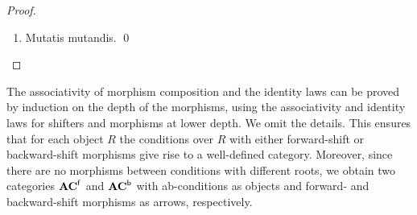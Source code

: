 \begin{fullorname}
\begin{proof}
\begin{enumerate}[resume]
Let $j = o^n(i)$ and let us proceed by cases. If both $n_i:b_i \to \cF^n_i(c_{j})$ and  $m_{j}:c_j \to \cF^m_j(e_{o^m(j)})$ are forward shift morphisms, we have $m_{j}:\cF^n_i(c_j) \to \cF^n_i(\cF^m_j(e_{o^m(j)}))$ by , and hence $\cF^m_j;\cF^n_i$ is a forward shifter for $v_i$ by  and, using the inductive hypothesis, $n_i;m_{o^n(i)}:b_i \to \cF^n_i(\cF^m_j(e_{o(i)}))$  is a forward shift morphism. 

If $e_{o(i)}$ has depth 0, then $m_{j}:c_j \to \zeroCond{P^c_j}$ is the terminal morphims, by Def.~\ref{def:ab-morphism} and clause 3 of . If $n_i:b_i \to \cF^n_i(c_{j})$ is a forward shift morphism then we obtain 
$n_i;m_{o^n(i)}:b_i \to \cF^n_i(\zeroCond{P^c_j})$ as above, and observe that $\cF^n_i(\zeroCond{P^c_j}) = \zeroCond{P^b_i}$, as desired. Otherwise, if $c_j$ has depth 0, then
$n_i: b_i \to \zeroCond{P^b_i}$ is the terminal morphism, and  $m_{j}:c_j \to \zeroCond{P^c_j}$ is the identity defined as $m_{j} = id_{\zeroCond{P^c_j}} = (o = \varnothing, \epsilon)$, that we can see as well as $id_{\zeroCond{P^b_i}}$; thus $n_i;m_{o^n(i)}: b_i \to \zeroCond{P^b_i}$ is the terminal morphism, as required. 

Finally observe that if $c_j$ has depth 0 and thus
$n_i: b_i \to \zeroCond{P^b_i}$ is the terminal morphism,
then $e_{o(i)}$ has depth 0 as well, and we fall in the previous cases. In fact, otherwise $m_{o^n(i)}: c_j \to \cF^m_j(e_{o(i)})$ should be a forward shift morphism, but by clause 2 of  $\cF^m_j(e_{o(i)})$ should have depth 0, and since shifters preserve depths  $e_{o(i)}$ should have depth 0 as well. 


\item Mutatis mutandis.
\qed
\end{enumerate}
\end{proof}
\end{fullorname}
%

The associativity of morphism composition and the identity laws can be proved by induction on the depth of the morphisms, using the associativity and identity laws for shifters and morphisms at lower depth. We omit the details. This ensures that for each object $R$ the conditions over $R$ with either forward-shift or backward-shift morphisms give rise to a well-defined category. Moreover, since there are no morphisms between conditions with different roots, we obtain two categories $\mathbf{AC}^{\mathsf{f}}$ and $\mathbf{AC}^{\mathsf{b}}$ with ab-conditions as objects and forward- and backward-shift morphisms as arrows, respectively.

